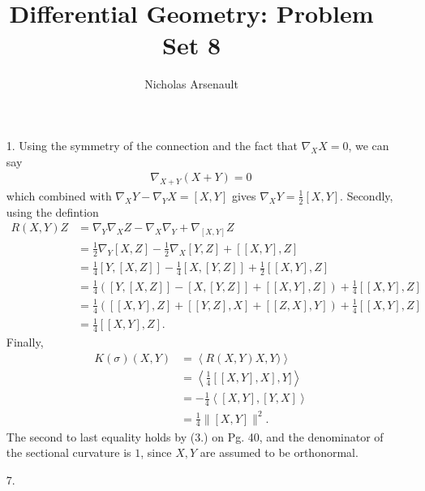 \documentclass[11pt]{amsart}
\begin{document}
\title
{
Differential Geometry: Problem Set 8 }
\author{Nicholas Arsenault}

\maketitle
\emph{\emph{}}
\begin{enumerate}
  \item[1.] Using the symmetry of the connection and the fact that $\nabla _{X} X = 0$, we can say
    \begin{align*}
      \nabla _{X+Y} (X+Y) = 0
    \end{align*}
    which combined with $\nabla _{X}Y - \nabla _{Y}X = [X,Y]$ gives $\nabla _{X}Y = \frac{1}{2} [X,Y]$.  Secondly, using the defintion
    \begin{align*}
      R(X,Y)Z &= \nabla _{Y} \nabla _{X} Z - \nabla _{X} \nabla _{Y} + \nabla _{[X,Y]}Z \\
              &= \frac{1}{2} \nabla _{Y} [X,Z] - \frac{1}{2} \nabla _{X} [Y,Z] + [[X,Y],Z] \\
              &= \frac{1}{4} [Y, [X,Z]] - \frac{1}{4} [X,[Y,Z]] + \frac{1}{2} [[X,Y],Z] \\
              &= \frac{1}{4} \left([Y,[X,Z]] - [X,[Y,Z]] + [[X,Y],Z] \right) + \frac{1}{4} [[X,Y],Z] \\
              &= \frac{1}{4} \left([[X,Y],Z] + [[Y,Z],X] + [[Z,X],Y] \right) + \frac{1}{4} [[X,Y],Z] \\
              &= \frac{1}{4} [[X,Y],Z].
    \end{align*}
Finally, 
\begin{align*}
  K(\sigma)(X,Y) &= \left<R(X,Y)X,Y) \right> \\
                 &= \left<\frac{1}{4}[[X,Y],X],Y] \right> \\
                 &= -\frac{1}{4}\left<[X,Y],[Y,X] \right> \\
                 &= \frac{1}{4} \|[X,Y]\|^2.
\end{align*}
The second to last equality holds by (3.) on Pg. 40, and the denominator of the sectional curvature is $1$, since $X,Y$ are assumed to be orthonormal.

\item[7.]
\end{enumerate}
\end{document}
